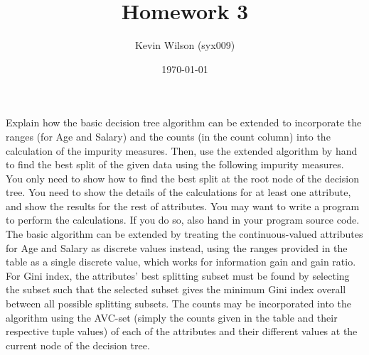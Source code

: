 \documentclass{scrartcl}
\begin{document}
\setlength\parindent{0pt}
\author{Kevin Wilson (syx009)}
\title{Homework 3}
\date{\today}
\maketitle

\newcommand{\gini}[3]{$Gini_{#1 \in \{#2\}}(D) \approx #3$}

\section{}
Explain how the basic decision tree algorithm can be extended to incorporate the ranges (for Age and Salary) and the counts (in the count column) into the calculation of the impurity measures.  Then, use the extended algorithm by hand to find the best split of the given data using the following impurity measures.  You only need to show how to find the best split at the root node of the decision tree.  You need to show the details of the calculations for at least one attribute, and show the results for the rest of attributes.  You may want to write a program to perform the calculations. If you do so, also hand in your program source code.\\

The basic algorithm can be extended by treating the continuous-valued attributes for Age and Salary as discrete values instead, using the ranges provided in the table as a single discrete value, which works for information gain and gain ratio. For Gini index, the attributes' best splitting subset must be found by selecting the subset such that the selected subset gives the minimum Gini index overall between all possible splitting subsets. The counts may be incorporated into the algorithm using the AVC-set (simply the counts given in the table and their respective tuple values) of each of the attributes and their different values at the current node of the decision tree.
\end{document}
